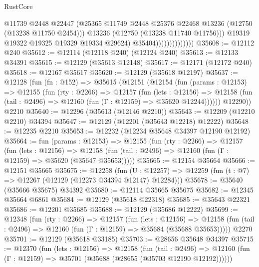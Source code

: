 \begin{lexlean}{RustCore}
\begin{coremodule}
                                    @11739
                                    @2448
                                    @22447
                                    (@25365
                                      @11749
                                      @2448
                                      @25376
                                      @22468
                                      @13236
                                      (@12750 (@13238 @11750 @2454)))
                                    @13236
                                    (@12750 (@13238 @11740 @11756)))
                                  @19319
                                  @19322
                                  @19325
                                  @19329
                                  @19334
                                  @29624)
                                @35404))))))))))))))
@35608 := @12112 @240
@35612 := @12114 (@12118 @240) (@12124 @240)
@35613 := @12133 @34391
@35615 := @12129 (@35613 @12148)
@35617 := @12171 (@12172 @240)
@35618 := @12167 @35617
@35620 := @12129 (@35618 @12197)
@35637 := @12128
    (fun (fn : @152) =>
    @35615
      (@12151
        (@12154
          (fun (params : @12153) =>
          @12155
            (fun (rty : @2266) =>
            @12157
              (fun (lets : @12156) =>
              @12158 (fun (tail : @2496) => @12160 (fun (Γ : @12159) => @35620 @12244))))))
        @12290))
    @2210
@35640 := @12296 (@35613 (@12146 @2210))
@35643 := @12209 (@12210 @2210) @34394
@35647 := @12129 (@12201 (@35643 @12218) @12222)
@35648 := @12235 @2210
@35653 := @12232 (@12234 @35648 @34397 @12190 @12192)
@35664 := fun (params : @12153) =>
  @12155
    (fun (rty : @2266) =>
    @12157
      (fun (lets : @12156) =>
      @12158 (fun (tail : @2496) => @12160 (fun (Γ : @12159) => @35620 (@35647 @35653)))))
@35665 := @12154 @35664
@35666 := @12151 @35665
@35675 := @12258
    (fun (U : @12257) => @12259 (fun (t : @7) => @12267 (@12129 (@12273 @34394 @12147) @12284)))
@35678 := @35640 (@35666 @35675) @34392
@35680 := @12114 @35665 @35675
@35682 := @12345 @35664 @6861
@35684 := @12129 (@35618 @22318)
@35685 := @35643 @22321
@35686 := @12201 @35685
@35688 := @12129 (@35686 @12222)
@35699 := @12348
    (fun (rty : @2266) =>
    @12157
      (fun (lets : @12156) =>
      @12158 (fun (tail : @2496) => @12160 (fun (Γ : @12159) => @35684 (@35688 @35653)))))
    @2270
@35701 := @12129 (@35618 @33185)
@35703 := @28656 @35648 @34397
@35715 := @12370
    (fun (lets : @12156) =>
    @12158
      (fun (tail : @2496) =>
      @12160 (fun (Γ : @12159) => @35701 (@35688 (@28655 (@35703 @12190 @12192))))))

\end{coremodule}
\end{lexlean}

